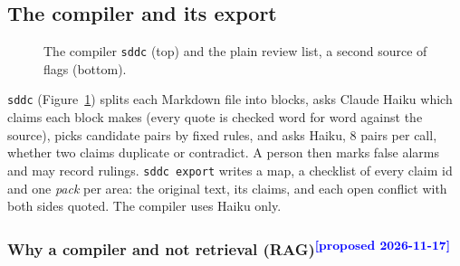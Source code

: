 \documentclass{article}
\newcommand{\proposed}{\textcolor{blue}{\textsuperscript{[proposed 2026-11-17]}}}
\newcommand{\code}[1]{\texttt{#1}}
\begin{document}
\subsection{The compiler and its export}\label{sec:compiler}

\begin{figure}[t]
\centering
{}
\caption{The compiler \code{sddc} (top) and the plain review list, a second source of flags (bottom).}
\label{fig:pipeline}
\end{figure}

\code{sddc} (Figure~\ref{fig:pipeline}) splits each Markdown file into blocks, asks Claude Haiku which claims
each block makes (every quote is checked word for word against the source), picks candidate pairs by
fixed rules, and asks Haiku, 8 pairs per call, whether two claims duplicate or contradict. A person then
marks false alarms and may record rulings. \code{sddc export} writes a map, a checklist of every claim id and
one \emph{pack} per area: the original text, its claims, and each open conflict with both sides quoted.
The compiler uses Haiku only.

\subsubsection{Why a compiler and not retrieval (RAG)\proposed}\label{sec:rag}
\end{document}
